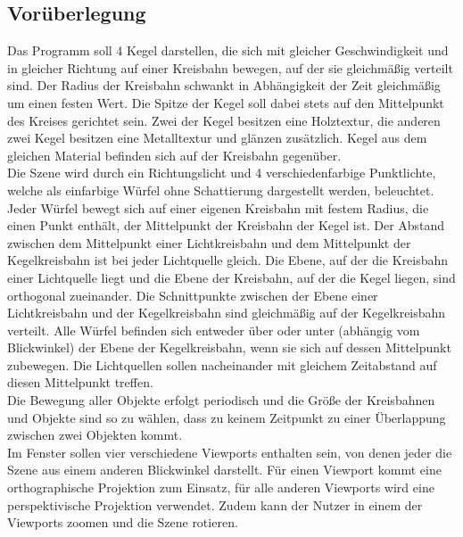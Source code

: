 \documentclass{scrartcl}
\begin{document}
        \subsection{Vorüberlegung}
            Das Programm soll 4 Kegel darstellen, die sich mit gleicher Geschwindigkeit 
            und in gleicher Richtung auf einer Kreisbahn bewegen, auf der sie gleichmäßig 
            verteilt sind. Der Radius der Kreisbahn schwankt in Abhängigkeit der Zeit 
            gleichmäßig um einen festen Wert. Die Spitze der Kegel soll dabei stets auf 
            den Mittelpunkt des Kreises gerichtet sein. Zwei der Kegel besitzen eine 
            Holztextur, die anderen zwei Kegel besitzen eine Metalltextur und glänzen 
            zusätzlich. Kegel aus dem gleichen Material befinden sich auf der Kreisbahn 
            gegenüber. \\
            Die Szene wird durch ein Richtungslicht und 4 verschiedenfarbige Punktlichte, 
            welche als einfarbige Würfel ohne Schattierung dargestellt werden, beleuchtet. 
            Jeder Würfel bewegt sich auf einer eigenen Kreisbahn mit festem Radius, die 
            einen Punkt enthält, der Mittelpunkt der Kreisbahn der Kegel ist. Der Abstand
            zwischen dem Mittelpunkt einer Lichtkreisbahn und dem Mittelpunkt der Kegelkreisbahn
            ist bei jeder Lichtquelle gleich. Die Ebene, 
            auf der die Kreisbahn einer Lichtquelle liegt und die Ebene der Kreisbahn, 
            auf der die Kegel liegen, sind orthogonal zueinander. Die Schnittpunkte 
            zwischen der Ebene einer Lichtkreisbahn und der Kegelkreisbahn sind 
            gleichmäßig auf der Kegelkreisbahn verteilt. Alle Würfel befinden sich 
            entweder über oder unter (abhängig vom Blickwinkel) der Ebene der 
            Kegelkreisbahn, wenn sie sich auf dessen Mittelpunkt zubewegen. 
            Die Lichtquellen sollen nacheinander mit gleichem Zeitabstand auf 
            diesen Mittelpunkt treffen. \\
            Die Bewegung aller Objekte erfolgt periodisch und die Größe der Kreisbahnen 
            und Objekte sind so zu wählen, dass zu keinem Zeitpunkt zu einer Überlappung 
            zwischen zwei Objekten kommt. \\
            Im Fenster sollen vier verschiedene Viewports enthalten sein, von denen jeder 
            die Szene aus einem anderen Blickwinkel darstellt. Für einen Viewport kommt
            eine orthographische Projektion zum Einsatz, für alle anderen Viewports wird eine perspektivische Projektion verwendet.
            Zudem kann der Nutzer in einem der Viewports zoomen und die Szene rotieren.
        \newpage
\end{document}
